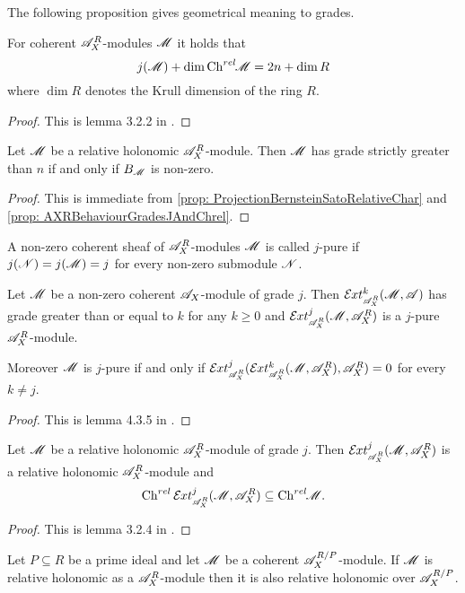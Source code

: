 The following proposition gives geometrical meaning to grades.
\begin{proposition}\label{prop: AXRBehaviourGradesJAndChrel}
  For coherent $\mathscr{A}_X^R$-modules $\mathscr{M}$ it holds that
  $$j(\mathscr{M}) + \dim \operatorname{Ch}^{rel}\mkern-5mu \mathscr{M} = 2n + \dim R $$
  where $\dim R$ denotes the Krull dimension of the ring $R$.
\end{proposition}
\begin{proof}
  This is lemma 3.2.2 in \cite{budur2019zero}.
\end{proof}
\begin{corollary}\label{cor: GradeIFFBernsteinIdeal}
  Let $\mathscr{M}$ be a relative holonomic $\mathscr{A}_X^R$-module. Then $\mathscr{M}$ has grade strictly greater than $n$ if and only if $B_{\mathscr{M}}$ is non-zero.
\end{corollary}
\begin{proof}
  This is immediate from \cref{prop: ProjectionBernsteinSatoRelativeChar} and \cref{prop: AXRBehaviourGradesJAndChrel}.
\end{proof}
\begin{definition}
  A non-zero coherent sheaf of $\mathscr{A}_X^R$-modules $\mathscr{M}$ is called $j$-pure if $j(\mathscr{N})=j(\mathscr{M})=j$ for every non-zero submodule $\mathscr{N}$.
\end{definition}
\begin{lemma}\label{lem: ExtGrade}
  Let $\mathscr{M}$ be a non-zero coherent $\mathscr{A}_X$-module of grade $j$. Then $\Ex{\A_X^R}{k}(\M,\A)$ has grade greater than or equal to $k$ for any $k\geq 0$ and $\Ex{\A_X^R}{j}(\M,\A_X^R)$ is a $j$-pure $\mathscr{A}_X^R$-module.

  Moreover $\mathscr{M}$ is $j$-pure if and only if $\Ex{\A_X^R}{j}(\Ex{\A_X^R}{k}(\M,\A_X^R),\A_X^R)=0$ for every $k\neq j$.
\end{lemma}
\begin{proof}
  This is lemma 4.3.5 in \cite{budur2019zero}.
\end{proof}
\begin{lemma}
  Let $\mathscr{M}$ be a relative holonomic $\mathscr{A}_X^R$-module of grade $j$. Then $\Ex{\A_X^R}{j}(\M,\A_X^R)$ is a relative holonomic $\mathscr{A}_X^R$-module and
  $$\Ch^{rel}\Ex{\A_X^R}{j}(\M,\A_X^R)\subseteq \Chrel \M. $$
\end{lemma}
\begin{proof}
  This is lemma 3.2.4 in \cite{budur2019zero}.
\end{proof}
\begin{lemma}
  Let $P \subseteq R$ be a prime ideal and let $\mathscr{M}$ be a coherent $\mathscr{A}_X^{R/P}$-module. If $\mathscr{M}$ is relative holonomic as a $\mathscr{A}_X^R$-module then it is also relative holonomic over $\mathscr{A}_X^{R/P}$.
\end{lemma}
